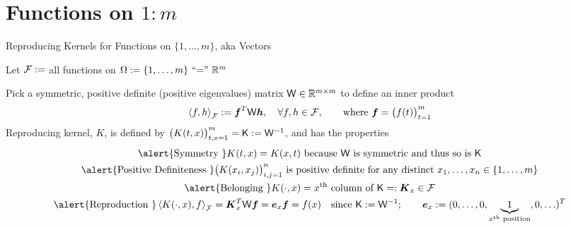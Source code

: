 \documentclass[10pt,compress,xcolor={usenames,dvipsnames},aspectratio=169]{beamer}
\begin{document}
\section{Functions on $1\!:\!m$}
\begin{frame}[label = RKRm]{Reproducing Kernels for Functions on $\{1, \ldots, m\}$, aka Vectors}
	
	\vspace{-3ex}
	Let $\cf:=$ all functions on $\Omega := \{1, \ldots, m\} \text{ ``$=$'' } \reals^m$
	
	Pick a symmetric, positive definite (positive eigenvalues) matrix $\mW \in \reals^{m \times m}$ to define an inner product \vspace{-0.3ex}
	\[
	\ip[\cf]{f}{h} : = \vf^T \mW \vh, \quad \forall f, h \in \cf, \qquad \text{where } \vf = \bigl(f(t) \bigr)_{t=1}^m
	\]
	\alert{Reproducing kernel}, $K$, is defined by 
			$\bigl ( K(t,x) \bigr)_{t,x=1}^m = \mK := \mW^{-1}$, and has the properties
		\vspace{-0.5ex}
		\begin{gather*}
			\alert{\text{Symmetry }} K(t,x) = K(x,t) \text{ because $\mW$ is symmetric and thus so is $\mK$} \\
			\alert{\text{Positive Definiteness }} \bigl(  K(x_i,x_j)\bigr)_{i,j = 1}^n \text{ is positive definite for any distinct } x_1, \ldots, x_n \in \{1, \ldots, m\}\\
			\alert{\text{Belonging }} K(\cdot,x) = \text{$x^{\text{th}}$ column of $\mK$} =: \vK_x \in \cf\\
			\alert{\text{Reproduction }} \ip[\cf]{K(\cdot,x)}{f} = \vK_x^T \mW \vf = \ve_x \vf = f(x) \quad \text{since } \mK := \mW^{-1};  \qquad 
				\ve_x := (0, \ldots, 0, \underbrace{1}_{x^{\text{th}} \text{ position}}, 0, \ldots )^T
		\end{gather*}
\end{frame}
\end{document}
